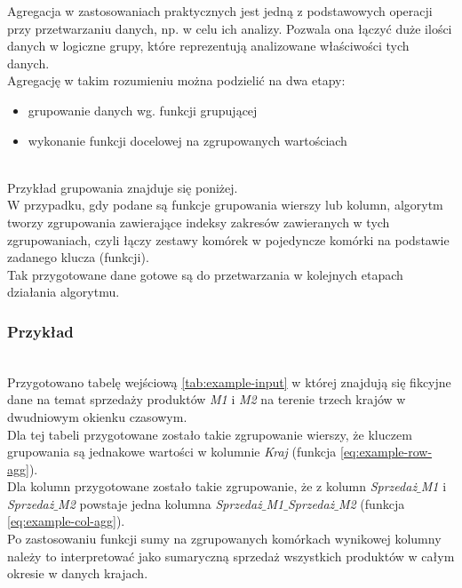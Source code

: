 \documentclass[brudnopis]{xmgr}
\begin{document}
Agregacja w zastosowaniach praktycznych jest jedną z podstawowych operacji przy przetwarzaniu danych, np. w celu ich analizy.
Pozwala ona łączyć duże ilości danych w logiczne grupy, które reprezentują analizowane właściwości tych danych.
\medskip\\

Agregację w takim rozumieniu można podzielić na dwa etapy:
\begin{itemize}
    \item grupowanie danych wg. funkcji grupującej
    \item wykonanie funkcji docelowej na zgrupowanych wartościach
\end{itemize}
\medskip\\

Przykład grupowania znajduje się poniżej.
\medskip\\

W przypadku, gdy podane są funkcje grupowania wierszy lub kolumn, algorytm tworzy zgrupowania zawierające indeksy zakresów zawieranych w tych zgrupowaniach, czyli łączy zestawy komórek w pojedyncze komórki na podstawie zadanego klucza (funkcji).
\medskip\\

Tak przygotowane dane gotowe są do przetwarzania w kolejnych etapach działania algorytmu.

\subsubsection{Przykład}
\medskip\\

Przygotowano tabelę wejściową \ref{tab:example-input} w której znajdują się fikcyjne dane na temat sprzedaży produktów \emph{M1} i \emph{M2} na terenie trzech krajów w dwudniowym okienku czasowym.
\medskip\\

Dla tej tabeli przygotowane zostało takie zgrupowanie wierszy, że kluczem grupowania są jednakowe wartości w kolumnie \emph{Kraj} (funkcja \ref{eq:example-row-agg}).
\medskip\\

Dla kolumn przygotowane zostało takie zgrupowanie, że z kolumn \emph{Sprzedaż$\_$M1} i \emph{Sprzedaż$\_$M2} powstaje jedna kolumna \emph{Sprzedaż$\_$M1$\_$Sprzedaż$\_$M2} (funkcja \ref{eq:example-col-agg}).
\medskip\\

Po zastosowaniu funkcji sumy na zgrupowanych komórkach wynikowej kolumny należy to interpretować jako sumaryczną sprzedaż wszystkich produktów w całym okresie w danych krajach.
\end{document}
